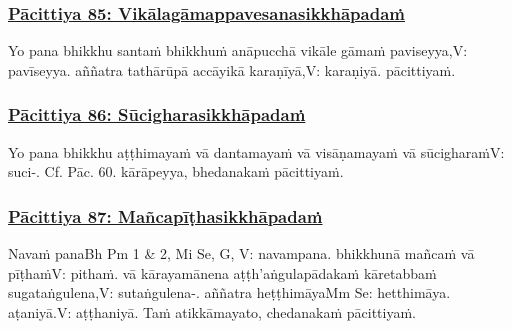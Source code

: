\subsubsection*{\hyperref[exp85]{Pācittiya 85: Vikālagāmappavesanasikkhāpadaṁ}}
\label{pac85}

Yo pana bhikkhu santaṁ bhikkhuṁ anāpucchā vikāle gāmaṁ paviseyya,\makeatletter\hyperlink{endnote-appendix}\makeatother  V: pavīseyya. aññatra tathārūpā accāyikā karaṇīyā,\makeatletter\hyperlink{endnote-appendix}\makeatother V: karaṇiyā. pācittiyaṁ.



\subsubsection*{\hyperref[exp86]{Pācittiya 86: Sūcigharasikkhāpadaṁ}}
\label{pac86}

Yo pana bhikkhu aṭṭhimayaṁ vā dantamayaṁ vā visāṇamayaṁ vā sūcigharaṁ\makeatletter\hyperlink{endnote-appendix}\makeatother V: suci-. Cf. Pāc. 60. kārāpeyya, bhedanakaṁ pācittiyaṁ.



\subsubsection*{\hyperref[exp87]{Pācittiya 87: Mañcapīṭhasikkhāpadaṁ}}
\label{pac87}

Navaṁ pana\makeatletter\hyperlink{endnote-appendix}\makeatother Bh Pm 1 & 2, Mi Se, G, V: navampana. bhikkhunā mañcaṁ vā pīṭhaṁ\makeatletter\hyperlink{endnote-appendix}\makeatother V: pithaṁ. vā kārayamānena aṭṭh'aṅgulapādakaṁ kāretabbaṁ sugataṅgulena,\makeatletter\hyperlink{endnote-appendix}\makeatother V: sutaṅgulena-. aññatra heṭṭhimāya\makeatletter\hyperlink{endnote-appendix}\makeatother Mm Se: hetthimāya. aṭaniyā.\makeatletter\hyperlink{endnote-appendix}\makeatother V: aṭṭhaniyā. Taṁ atikkāmayato, chedanakaṁ pācittiyaṁ.



